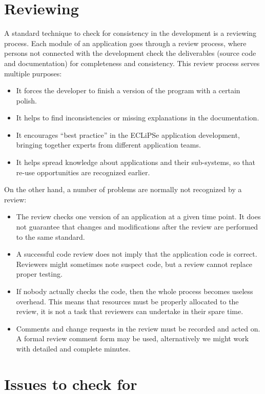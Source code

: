 \documentclass[a4paper,12pt]{report}
\begin{document}
\section{Reviewing}
A standard technique to check for consistency in the development is a reviewing process. Each module of an application goes through a review process, where persons not connected with the development check the deliverables (source code and documentation) for completeness and consistency. This review process serves multiple purposes:
\begin{itemize}
\item It forces the developer to finish a version of the program with a certain polish. 
\item It helps to find inconsistencies or missing explanations in the documentation.
\item It encourages ``best practice'' in the ECLiPSe application development, bringing together experts from different application teams.
\item It helps spread knowledge about applications and their sub-systems, so that re-use opportunities are recognized earlier.
\end{itemize}
On the other hand, a number of problems are normally not recognized by a review:
\begin{itemize}
\item The review checks one version of an application at a given time point. It does not guarantee that changes and modifications after the review are performed to the same standard.
\item A successful code review does not imply that the application code is correct. Reviewers might sometimes note suspect code, but a review cannot replace proper testing.
\item If nobody actually checks the code, then the whole process becomes useless overhead. This means that resources must be properly allocated to the review, it is not a task that reviewers can undertake in their spare time.
\item Comments and change requests in the review must be recorded and acted on. A formal review comment form may be used, alternatively we might work with detailed and complete minutes.
\end{itemize}

\section{Issues to check for}
\end{document}
